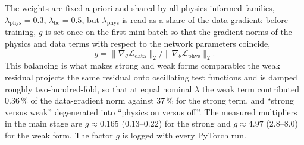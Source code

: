 The weights are fixed a priori and shared by all physics-informed families,
$\lambda_{\mathrm{phys}}=0.3$, $\lambda_{\mathrm{bc}}=0.5$,
but $\lambda_{\mathrm{phys}}$ is read as a share of the data gradient: before
training, $g$ is set once on the first mini-batch so that the gradient norms of
the physics and data terms with respect to the network parameters coincide,
\begin{equation}
  g = \lVert\nabla_{\theta}\mathcal{L}_{\mathrm{data}}\rVert_2 \big/
      \lVert\nabla_{\theta}\mathcal{L}_{\mathrm{phys}}\rVert_2 .
  \label{eq:calib}
\end{equation}
This balancing \citep{wang2022} is what makes strong and weak
forms comparable: the weak residual projects the same residual onto oscillating
test functions and is damped roughly two-hundred-fold, so that at equal nominal
$\lambda$ the weak term contributed 0.36\,\% of the data-gradient norm against
37\,\% for the strong term, and ``strong versus weak'' degenerated into ``physics
on versus off''.
The measured multipliers in the main stage are $g\approx0.165$ (0.13--0.22) for
the strong and $g\approx4.97$ (2.8--8.0) for the weak form. The factor $g$ is logged with
every PyTorch run.

